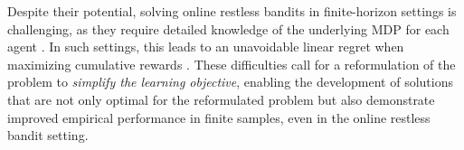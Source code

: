 Despite their potential, solving online restless bandits in finite-horizon settings is
challenging, 
as they require detailed knowledge of the underlying MDP for each agent \citep{jung2019regret,wang2020restless,wang2023optimistic}. 
In such settings, this 
leads to an 
unavoidable linear regret  
when maximizing cumulative rewards \citep{azar2017minimax}.
These difficulties call for a reformulation of the problem to \emph{simplify the learning objective}, enabling the development of solutions that are not only optimal for the reformulated problem but also demonstrate improved empirical performance in finite samples, even in the online restless bandit setting.

